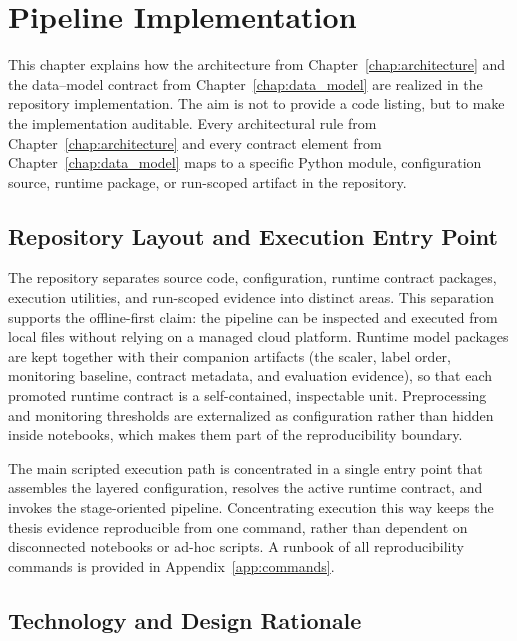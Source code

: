 
\chapter{Pipeline Implementation}
\label{chap:implementation}

This chapter explains how the architecture from Chapter~\ref{chap:architecture} and the data--model contract from Chapter~\ref{chap:data_model} are realized in the repository implementation. The aim is not to provide a code listing, but to make the implementation auditable. Every architectural rule from Chapter~\ref{chap:architecture} and every contract element from Chapter~\ref{chap:data_model} maps to a specific Python module, configuration source, runtime package, or run-scoped artifact in the repository.

\section{Repository Layout and Execution Entry Point}
\label{sec:repository_layout}

The repository separates source code, configuration, runtime contract packages, execution utilities, and run-scoped evidence into distinct areas. This separation supports the offline-first claim: the pipeline can be inspected and executed from local files without relying on a managed cloud platform. Runtime model packages are kept together with their companion artifacts (the scaler, label order, monitoring baseline, contract metadata, and evaluation evidence), so that each promoted runtime contract is a self-contained, inspectable unit. Preprocessing and monitoring thresholds are externalized as configuration rather than hidden inside notebooks, which makes them part of the reproducibility boundary.

The main scripted execution path is concentrated in a single entry point that assembles the layered configuration, resolves the active runtime contract, and invokes the stage-oriented pipeline. Concentrating execution this way keeps the thesis evidence reproducible from one command, rather than dependent on disconnected notebooks or ad-hoc scripts. A runbook of all reproducibility commands is provided in Appendix~\ref{app:commands}.

\section{Technology and Design Rationale}
\label{sec:technology_rationale}

